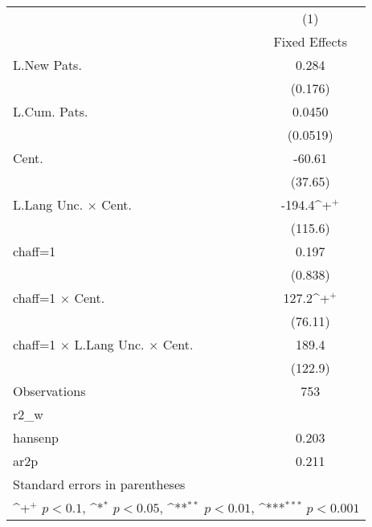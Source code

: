 {
\def\sym#1{\ifmmode^{#1}\else\(^{#1}\)\fi}
\begin{tabular}{l*{1}{c}}
\hline\hline
                    &\multicolumn{1}{c}{(1)}\\
                    &\multicolumn{1}{c}{Fixed Effects}\\
\hline
L.New Pats.         &       0.284         \\
                    &     (0.176)         \\
L.Cum. Pats.        &      0.0450         \\
                    &    (0.0519)         \\
Cent.               &      -60.61         \\
                    &     (37.65)         \\
L.Lang Unc. $\times$ Cent.&      -194.4\sym{+}  \\
                    &     (115.6)         \\
chaff=1             &       0.197         \\
                    &     (0.838)         \\
chaff=1 $\times$ Cent.&       127.2\sym{+}  \\
                    &     (76.11)         \\
chaff=1 $\times$ L.Lang Unc. $\times$ Cent.&       189.4         \\
                    &     (122.9)         \\
\hline
Observations        &         753         \\
r2\_w                &                     \\
hansenp             &       0.203         \\
ar2p                &       0.211         \\
\hline\hline
\multicolumn{2}{l}{\footnotesize Standard errors in parentheses}\\
\multicolumn{2}{l}{\footnotesize \sym{+} \(p<0.1\), \sym{*} \(p<0.05\), \sym{**} \(p<0.01\), \sym{***} \(p<0.001\)}\\
\end{tabular}
}
